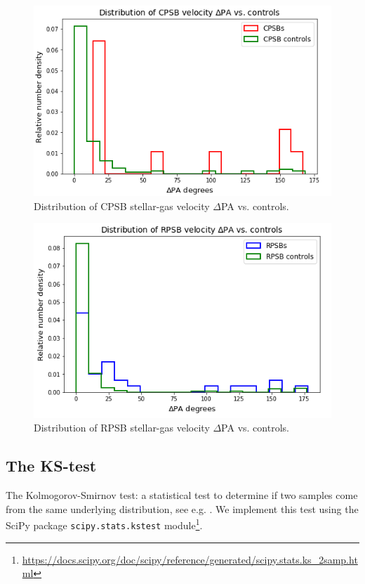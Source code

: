 \begin{figure}
    \centering
    \includegraphics[width=\columnwidth]{images/JupyterPlots/Distribution-of-CPSB-dPA-vs-controls.png}
    \caption{Distribution of CPSB stellar-gas velocity $\Delta$PA vs. controls.}
    \label{fig:CPSBvsControlDeltaPAs}
\end{figure}

\begin{figure}
    \centering
    \includegraphics[width=\columnwidth]{images/JupyterPlots/Distribution-of-RPSB-dPA-vs-controls.png}
    \caption{Distribution of RPSB stellar-gas velocity $\Delta$PA vs. controls.}
    \label{fig:RPSBvsControlDeltaPAs}
\end{figure}

\subsection{The KS-test}
The Kolmogorov-Smirnov test: a statistical test to determine if two samples come from the same underlying distribution, see e.g. \citet{hodges1958significance}. We implement this test using the SciPy package \texttt{scipy.stats.kstest} module\footnote{\href{}{https://docs.scipy.org/doc/scipy/reference/generated/scipy.stats.ks\_2samp.html}}.

